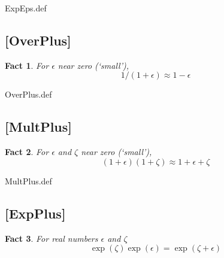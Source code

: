 \documentclass{handout}
\newtheorem{Fact}{Fact}
\begin{document}
\begin{verbatimwrite}{ExpEps.def}
\providecommand{\ExpEps}{\href{https://www.econ2.jhu.edu/people/ccarroll/public/LectureNotes/MathFacts/MathFactsList\#ExpEps}{\ensuremath{\mathtt{[ExpEps]}}}}
\end{verbatimwrite}


\hypertarget{OverPlus}{}
\subsection{[OverPlus]}
\begin{Fact} For $\epsilon$ near zero (`small'), 
\begin{equation}
1/(1+\epsilon) \approx 1-\epsilon
\end{equation}
\end{Fact}

\begin{verbatimwrite}{OverPlus.def}
\providecommand{\OverPlus}{\href{https://www.econ2.jhu.edu/people/ccarroll/public/LectureNotes/MathFacts/MathFactsList\#OverPlus}{\ensuremath{\mathtt{[OverPlus]}}}}
\end{verbatimwrite}


\hypertarget{MultPlus}{}
\subsection{[MultPlus]}
\begin{Fact} For $\epsilon$ and $\zeta$ near zero (`small'), 
\begin{equation}
(1+\epsilon)(1+\zeta) \approx 1+\epsilon+\zeta
\end{equation}
\end{Fact}

\begin{verbatimwrite}{MultPlus.def}
\providecommand{\MultPlus}{\href{https://www.econ2.jhu.edu/people/ccarroll/public/LectureNotes/MathFacts/MathFactsList\#MultPlus}{\ensuremath{\mathtt{[MultPlus]}}}}
\end{verbatimwrite}

\hypertarget{ExpPlus}{}
\subsection{[ExpPlus]}
\begin{Fact} For real numbers $\epsilon$ and $\zeta$ 
\begin{equation}
\exp(\zeta)\exp(\epsilon) = \exp(\zeta+\epsilon)
\end{equation}
\end{Fact}
\end{document}
